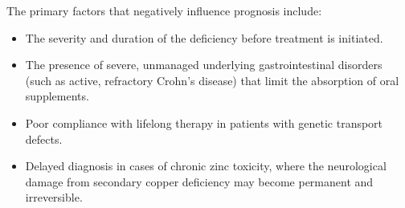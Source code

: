 The primary factors that negatively influence prognosis include:
\begin{itemize}
    \item The severity and duration of the deficiency before treatment is initiated.
    \item The presence of severe, unmanaged underlying gastrointestinal disorders (such as active, refractory Crohn's disease) that limit the absorption of oral supplements.
    \item Poor compliance with lifelong therapy in patients with genetic transport defects.
    \item Delayed diagnosis in cases of chronic zinc toxicity, where the neurological damage from secondary copper deficiency may become permanent and irreversible.
\end{itemize}

